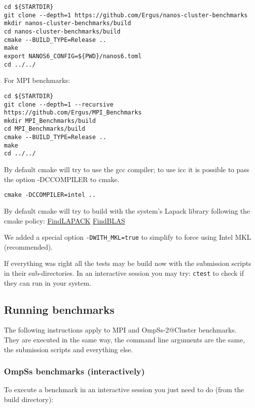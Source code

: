 \documentclass{article}
\newcommand{\code}[1]{\texttt{#1}}
\begin{document}
\begin{lstlisting}
cd ${STARTDIR}
git clone --depth=1 https://github.com/Ergus/nanos-cluster-benchmarks
mkdir nanos-cluster-benchmarks/build
cd nanos-cluster-benchmarks/build
cmake --BUILD_TYPE=Release ..
make
export NANOS6_CONFIG=${PWD}/nanos6.toml
cd ../../
\end{lstlisting}

For MPI benchmarks:

\begin{lstlisting}
cd ${STARTDIR}
git clone --depth=1 --recursive https://github.com/Ergus/MPI_Benchmarks
mkdir MPI_Benchmarks/build
cd MPI_Benchmarks/build
cmake --BUILD_TYPE=Release ..
make
cd ../../
\end{lstlisting}

By default cmake will try to use the gcc compiler; to use icc it is
possible to pass the option -DCCOMPILER to cmake.

\begin{lstlisting}
cmake -DCCOMPILER=intel ..
\end{lstlisting}

By default cmake will try to build with the system's Lapack library
following the cmake policy:
\href{https://cmake.org/cmake/help/latest/module/FindLAPACK.html}{FindLAPACK}
\href{https://cmake.org/cmake/help/latest/module/FindBLAS.html}{FindBLAS}

We added a special option \code{-DWITH\_MKL=true} to simplify to force
using Intel MKL (recommended).

If everything was right all the tests may be build now with the
submission scripts in their sub-directories. In an interactive session
you may try: \code{ctest} to check if they can run in your system.

\subsection{Running benchmarks}

The following instructions apply to MPI and OmpSs-2@Cluster
benchmarks.  They are executed in the same way, the command line
arguments are the same, the submission scripts and everything else.

\subsubsection{OmpSs benchmarks (interactively)}
To execute a benchmark in an interactive session you just need to do
(from the build directory):
\end{document}

